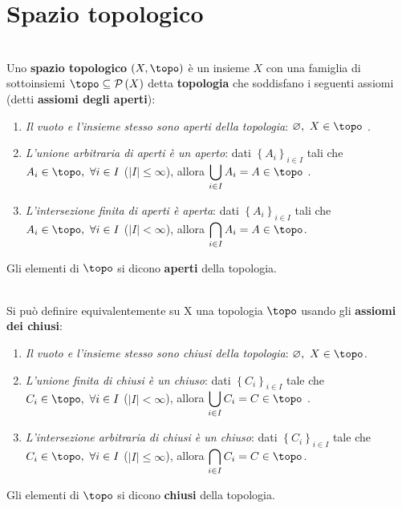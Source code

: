 \section{Spazio topologico}
\begin{define}~{}\\
	Uno \textbf{spazio topologico} $\left(X, \topo\right)$ è un insieme $X$ con una famiglia di sottoinsiemi $\topo\subseteq\setpart{X}$ detta \textbf{topologia} che soddisfano i seguenti assiomi (detti \textbf{assiomi degli aperti}):
	\begin{enumerate}
		\item \textit{Il vuoto e l'insieme stesso sono aperti della topologia}: $\emptyset,\ X\in\topo$ .
		\item \textit{L'unione arbitraria di aperti è un aperto}: dati $\left\{A_i\right\}_{i\in I}$ tali che $A_i\in\topo,\ \forall i\in I$ ($\left| I\right|\leq \infty$), allora $\displaystyle\union_{i\in I}A_i=A\in\topo$ .
		\item \textit{L'intersezione finita di aperti è aperta}: dati $\left\{A_i\right\}_{i\in I}$ tali che $A_i\in\topo,\ \forall i\in I$ ($\left|I\right|< \infty$), allora $\displaystyle\inter_{i\in I}A_i=A\in\topo$.
	\end{enumerate}
	Gli elementi di $\topo$ si dicono \textbf{aperti} della topologia.
\end{define}

\begin{define}~{}\\
 Si può definire equivalentemente su X una topologia $\topo$ usando gli \textbf{assiomi dei chiusi}:
	\begin{enumerate}
		\item \textit{Il vuoto e l'insieme stesso sono chiusi della topologia}: $\emptyset,\ X\in\topo$.
		\item \textit{L'unione finita di chiusi è un chiuso}: dati $\left\{C_i\right\}_{i\in I}$ tale che $C_i\in\topo,\ \forall i\in I$ ($\left|I\right|< \infty$), allora $\displaystyle\union_{i\in I}C_i=C\in\topo$ .
		\item \textit{L'intersezione arbitraria di chiusi è un chiuso}: dati $\left\{C_i\right\}_{i\in I}$ tale che $C_i\in\topo,\ \forall i\in I$ ($\left|I\right|\leq \infty$), allora $\displaystyle\inter_{i\in I}C_i=C\in\topo$.
	\end{enumerate}
	Gli elementi di $\topo$ si dicono \textbf{chiusi} della topologia.
\end{define}

